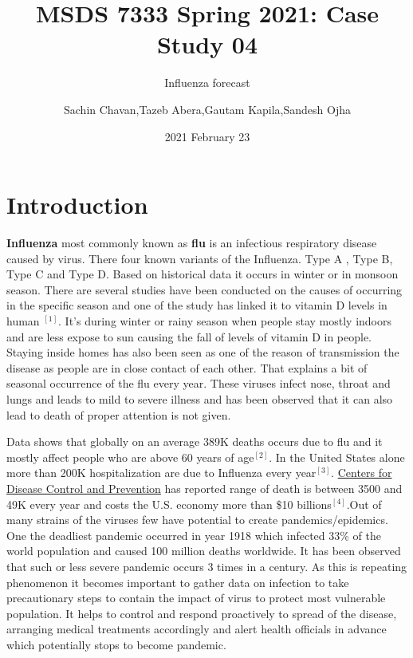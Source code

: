 \documentclass[
]{article}
\title{MSDS 7333 Spring 2021: Case Study 04}
\subtitle{Influenza forecast}
\author{Sachin Chavan,Tazeb Abera,Gautam Kapila,Sandesh Ojha}
\date{2021 February 23}
\begin{document}
\maketitle

\hypertarget{introduction}{%
\section{Introduction}\label{introduction}}

\textbf{Influenza} most commonly known as \textbf{flu} is an infectious
respiratory disease caused by virus. There four known variants of the
Influenza. Type A , Type B, Type C and Type D. Based on historical data
it occurs in winter or in monsoon season. There are several studies have
been conducted on the causes of occurring in the specific season and one
of the study has linked it to vitamin D levels in human
\protect\hyperlink{references}{\(^{[1]}\)}. It's during winter or rainy
season when people stay mostly indoors and are less expose to sun
causing the fall of levels of vitamin D in people. Staying inside homes
has also been seen as one of the reason of transmission the disease as
people are in close contact of each other. That explains a bit of
seasonal occurrence of the flu every year. These viruses infect nose,
throat and lungs and leads to mild to severe illness and has been
observed that it can also lead to death of proper attention is not
given.

Data shows that globally on an average 389K deaths occurs due to flu and
it mostly affect people who are above 60 years of
age\protect\hyperlink{references}{\(^{[2]}\)}. In the United States
alone more than 200K hospitalization are due to Influenza every
year\protect\hyperlink{references}{\(^{[3]}\)}.
\href{https://www.cdc.gov/}{Centers for Disease Control and Prevention}
has reported range of death is between 3500 and 49K every year and costs
the U.S. economy more than \$10
billions\protect\hyperlink{references}{\(^{[4]}\)}.Out of many strains
of the viruses few have potential to create pandemics/epidemics. One the
deadliest pandemic occurred in year 1918 which infected 33\% of the
world population and caused 100 million deaths worldwide. It has been
observed that such or less severe pandemic occurs 3 times in a century.
As this is repeating phenomenon it becomes important to gather data on
infection to take precautionary steps to contain the impact of virus to
protect most vulnerable population. It helps to control and respond
proactively to spread of the disease, arranging medical treatments
accordingly and alert health officials in advance which potentially
stops to become pandemic.
\end{document}
